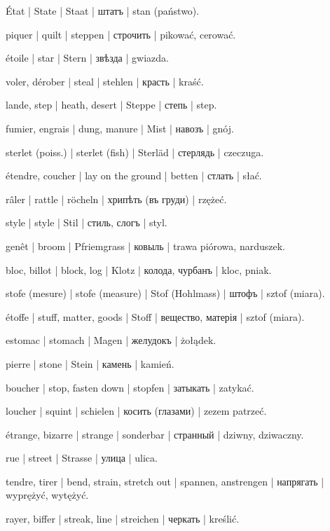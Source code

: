 \begin{outdent}{1em}
État | State | Staat | штатъ | stan (państwo).

piquer | quilt | steppen | строчить | pikować, cerować.

étoile | star | Stern | звѣзда | gwiazda.

voler, dérober | steal | stehlen | красть | kraść.

lande, step | heath, desert | Steppe | степь | step.

fumier, engrais | dung, manure | Mist | навозъ | gnój.

sterlet (poiss.) | sterlet (fish) | Sterläd | стерлядь | czeczuga.

étendre, coucher | lay on the ground | betten | стлать | słać.

râler | rattle | röcheln | хрипѣть (въ груди) | rzężeć.

style | style | Stil | стиль, слогъ | styl.

genêt | broom | Pfriemgrass | ковыль | trawa piórowa, narduszek.

bloc, billot | block, log | Klotz | колода, чурбанъ | kloc,
pniak.

stofe (mesure) | stofe (measure) | Stof (Hohlmass) | штофъ | sztof (miara).

étoffe | stuff, matter, goods | Stoff | вещество, матерія | sztof (miara).

estomac | stomach | Magen | желудокъ | żołądek.

pierre | stone | Stein | камень | kamień.

boucher | stop, fasten down | stopfen | затыкать | zatykać.

loucher | squint | schielen | косить (глазами) | zezem
patrzeć.

étrange, bizarre | strange | sonderbar | странный | dziwny,
dziwaczny.

rue | street | Strasse | улица | ulica.

tendre, tirer | bend, strain, stretch out | spannen,
anstrengen | напрягать | wyprężyć, wytężyć.

rayer, biffer | streak, line | streichen | черкать | kreślić.


\end{outdent}
